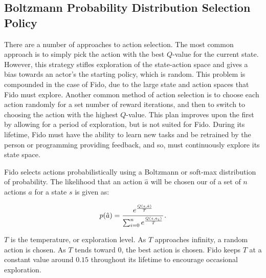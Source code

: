 \subsection{Boltzmann Probability Distribution Selection Policy}

There are a number of approaches to action selection. The most common approach is to simply pick the action with the best $Q$-value for the current state. However, this strategy stifles exploration of the state-action space and gives a bias towards an actor's the starting policy, which is random. This problem is compounded in the case of Fido, due to the large state and action spaces that Fido must explore. Another common method of action selection is to choose each action randomly for a set number of reward iterations, and then to switch to choosing the action with the highest $Q$-value. This plan improves upon the first by allowing for a period of exploration, but is not suited for Fido. During its lifetime, Fido must have the ability to learn new tasks and be retrained by the person or programming providing feedback, and so, must continuously explore its state space.

Fido selects actions probabilistically using a Boltzmann or soft-max distribution of probability. The likelihood that an action $\hat{a}$ will be chosen our of a set of $n$ actions $a$ for a state $s$ is given as:

\begin{equation}
	p(\hat{a}) = \cfrac{e^{\frac{Q(s, \hat{a})}{T}}}{\sum_{i=0}^{n}e^{\frac{Q(s, a_i)}{T}}}
	\,.
	\label{equ::boltzmann}
\end{equation}

$T$ is the temperature, or exploration level. As $T$ approaches infinity, a random action is chosen. As $T$ tends toward 0, the best action is chosen. Fido keeps $T$ at a constant value around $0.15$ throughout its lifetime to encourage occasional exploration.
